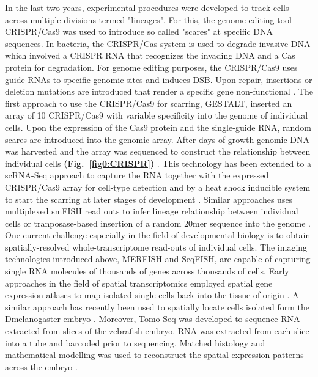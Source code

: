 In the last two years, experimental procedures were developed to track cells across multiple divisions termed "lineages". For this, the genome editing tool \gls{CRISPR}/\gls{Cas9} \citep{Jinek2012} was used to introduce so called "scares" at specific DNA sequences. In bacteria, the CRISPR/Cas system is used to degrade invasive DNA which involved a CRISPR RNA that recognizes the invading DNA and a Cas protein for degradation. For genome editing purposes, the \gls{CRISPR}/\gls{Cas9} uses guide RNAs to specific genomic sites and induces \gls{DSB}. Upon repair, insertions or deletion mutations are introduced that render a specific gene non-functional \citep{Zhang2014c}. The first approach to use the 	\gls{CRISPR}/\gls{Cas9} for scarring, \gls{GESTALT}, inserted an array of 10 \gls{CRISPR}/\gls{Cas9} with variable specificity into the genome of individual cells. Upon the expression of the Cas9 protein and the single-guide RNA, random scares are introduced into the genomic array. After days of growth genomic DNA was harvested and the array was sequenced to construct the relationship between individual cells \textbf{(Fig.~\ref{fig0:CRISPR})} \citep{McKenna2016}. This technology has been extended to a scRNA-Seq approach to capture the RNA together with the expressed \gls{CRISPR}/\gls{Cas9} array for cell-type detection and by a heat shock inducible system to start the scarring at later stages of development \citep{Raj2018}. Similar approaches uses multiplexed smFISH read outs to infer lineage relationship between individual cells \citep{Frieda2017} or tranposase-based insertion of a random 20mer sequence into the genome \citep{Wagner2018}.\\

One current challenge especially in the field of developmental biology is to obtain spatially-resolved whole-transcriptome read-outs of individual cells. The imaging technologies introduced above, MERFISH and SeqFISH, are capable of capturing single RNA molecules of thousands of genes across thousands of cells. Early approaches in the field of spatial transcriptomics employed spatial gene expression atlases to map isolated single cells back into the tissue of origin \citep{Achim2015a, Satija2015a}. A similar approach has recently been used to spatially locate cells isolated form the \gls{Dmelanogaster} embryo . Moreover, Tomo-Seq was developed to sequence RNA extracted from slices of the zebrafish embryo. RNA was extracted from each slice into a tube and barcoded prior to sequencing. Matched histology and mathematical modelling was used to reconstruct the spatial expression patterns across the embryo \citep{Junker2014a}.

